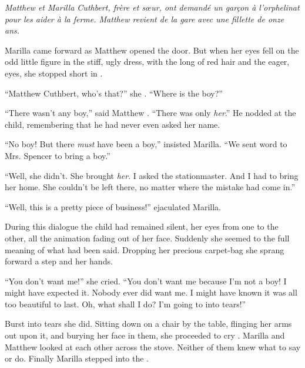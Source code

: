 \documentclass[troisieme]{fiche}
\begin{document}
\noindent\small\textit{Matthew et Marilla Cuthbert, frère et sœur, ont demandé un garçon à
l'orphelinat pour les aider à la ferme. Matthew revient de la gare avec une fillette de onze
ans.}\normalsize

\begin{texte}
Marilla came  forward as Matthew opened the door. But when
her eyes fell on the odd little figure in the stiff, ugly dress, with the long
 of red hair and the eager, 
eyes, she stopped short in .

``Matthew Cuthbert, who's that?'' she .
``Where is the boy?''

``There wasn't any boy,'' said Matthew . ``There was
only \emph{her}.'' He nodded at the child, remembering that he had never even asked her name.

``No boy! But there \emph{must} have been a boy,'' insisted Marilla. ``We sent word to Mrs.
Spencer to bring a boy.''

``Well, she didn't. She brought \emph{her}. I asked the stationmaster. And I had to bring her
home. She couldn't be left there, no matter where the mistake had come in.''

``Well, this is a pretty piece of business!'' ejaculated Marilla.

During this dialogue the child had remained silent, her eyes  from
one to the other, all the animation fading out of her face. Suddenly she seemed to
 the full meaning of what had been said. Dropping her precious
carpet-bag she sprang forward a step and  her hands.

``You don't want me!'' she cried. ``You don't want me because I'm not a boy! I might have
expected it. Nobody ever did want me. I might have known it was all too beautiful to last. Oh,
what shall I do? I'm going to  into tears!''

Burst into tears she did. Sitting down on a chair by the table, flinging her arms out upon it,
and burying her face in them, she proceeded to cry .
Marilla and Matthew looked at each other
 across the stove. Neither of them knew what
to say or do. Finally Marilla stepped  into the
.


\end{texte}
\end{document}
